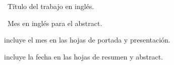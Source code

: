 
\pa

\pa

\pa

\pa

\pa

\pa

\pa

\pa

\espaciodoble

\pa

\pa

\pa

\espaciodoble

\pa

\espaciodoble

\pa\ Título del trabajo en inglés.

\pa\ Mes en inglés para el abstract.

\pa

\espaciodoble

 incluye el mes en las hojas de portada y presentación.

 incluye la fecha en las hojas de resumen y abstract.
